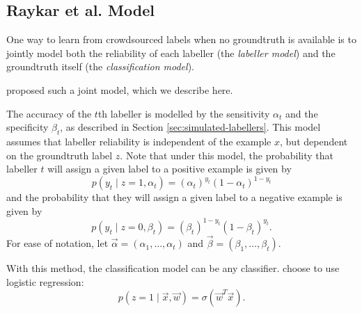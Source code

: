 
    \subsection{Raykar et al. Model}
    \label{sec:raykar}

        One way to learn from crowdsourced labels when no groundtruth is
        available is to jointly model both the reliability of each labeller (the
        \emph{labeller model}) and the groundtruth itself (the
        \emph{classification model}).

        \citet{raykar10} proposed such a joint model, which we describe here.

        The accuracy of the $t$th labeller is modelled by the sensitivity
        $\alpha_t$ and the specificity $\beta_t$, as described in Section
        \ref{sec:simulated-labellers}. This model assumes that labeller
        reliability is independent of the example $x$, but dependent on the
        groundtruth label $z$. Note that under this model, the probability that
        labeller $t$ will assign a given label to a positive example is given by
        \begin{equation*}
            p(y_t \mid z = 1, \alpha_t) =
                (\alpha_t)^{y_t} (1 - \alpha_t)^{1 - y_t}
        \end{equation*}
        and the probability that they will assign a given label to a negative
        example is given by
        \begin{equation*}
            p(y_t \mid z = 0, \beta_t) =
                (\beta_t)^{1 - y_t} (1 - \beta_t)^{y_t}.
        \end{equation*}
        For ease of notation, let $\vec \alpha = (\alpha_1, \dots, \alpha_t)$
        and $\vec \beta = (\beta_1, \dots, \beta_t)$.

        With this method, the classification model can be any classifier.
        \citeauthor{raykar10} choose to use logistic regression:
        \begin{equation}
            \label{eq:raykar-logreg}
            p(z = 1 \mid \vec x, \vec w) = \sigma(\vec w^T \vec x).
        \end{equation}

